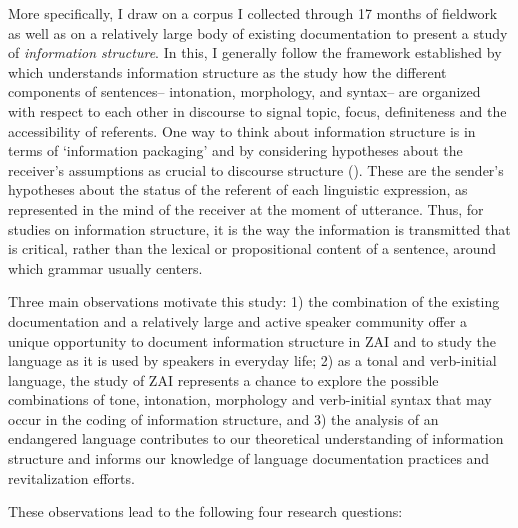 More specifically, I draw on a corpus I collected through 17 months of fieldwork as well as on a relatively large body of existing documentation to present a study of \textit{information structure}. In this, I generally follow the framework established by \citet{lambrecht1994} which understands information structure as the study how the different components of sentences-- intonation, morphology, and syntax-- are organized with respect to each other in discourse to signal topic, focus, definiteness and the accessibility of referents. One way to think about information structure is in terms of `information packaging' and by considering hypotheses about the receiver's assumptions as crucial to discourse structure (\citealt{chafe1994,lambrecht1994}). These are the sender's hypotheses about the status of the referent of each linguistic expression, as represented in the mind of the receiver at the moment of utterance. Thus, for studies on information structure, it is the way the information is transmitted that is critical, rather than the lexical or propositional content of a sentence, around which grammar usually centers.

Three main observations motivate this study: 1) the combination of the existing documentation and a relatively large and active speaker community offer a unique opportunity to document information structure in ZAI and to study the language as it is used by speakers in everyday life; 2) as a tonal and verb-initial language, the study of ZAI represents a chance to explore the possible combinations of tone, intonation, morphology and verb-initial syntax that may occur in the coding of information structure, and 3) the analysis of an endangered language contributes to our theoretical understanding of information structure and informs our knowledge of language documentation practices and revitalization efforts. 

These observations lead to the following four research questions: 

